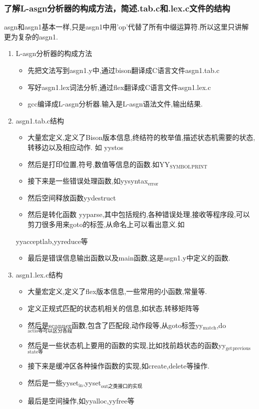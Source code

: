 \documentclass[11pt]{article}
\begin{document}
\subsubsection{了解L-asgn分析器的构成方法，简述.tab.c和.lex.c文件的结构}
\label{sec-1-1-4}
asgn和asgn1基本一样,只是asgn1中用'op'代替了所有中缀运算符.所以这里只讲解更为复杂的asgn1.
\begin{enumerate}
\item L-asgn分析器的构成方法
\label{sec-1-1-4-1}
\begin{itemize}
\item 先把文法写到asgn1.y中,通过bison翻译成C语言文件asgn1.tab.c
\item 写好asgn1.lex词法分析,通过flex翻译成C语言文件asgn1.lex.c
\item gcc编译成L-asgn分析器.输入是L-asgn语法文件,输出结果.
\end{itemize}
\item asgn1.tab.c结构
\label{sec-1-1-4-2}
\begin{itemize}
\item 大量宏定义,定义了Bison版本信息,终结符的枚举值,描述状态机需要的状态,转移边以及相应动作. 如 yystos
\item 然后是打印位置,符号,数值等信息的函数.如YY$_{\text{SYMBOL}}$$_{\text{PRINT}}$
\item 接下来是一些错误处理函数,如yysyntax$_{\text{error}}$
\item 然后空间释放函数yydestruct
\item 然后是转化函数 yyparse,其中包括规约,各种错误处理,接收等程序段,可以剪刀很多用来goto的标签,从命名上可以看出意义.如
\end{itemize}
yyacceptlab,yyreduce等     
\begin{itemize}
\item 最后是错误信息输出函数以及main函数,这是asgn1.y中定义的函数.
\end{itemize}
\item asgn1.lex.c结构
\label{sec-1-1-4-3}
\begin{itemize}
\item 大量宏定义,定义了flex版本信息,一些常用的小函数,常量等.
\item 定义正规式匹配的状态机相关的信息,如状态,转移矩阵等
\item 然后是scanner函数,包含了匹配段,动作段等,从goto标签yy$_{\text{match}}$,do$_{\text{actio等可以区分各段}}$
\item 然后是一些状态机上要用的函数的实现,比如找前趋状态的函数yy$_{\text{get}}$$_{\text{previous}}$$_{\text{state等}}$
\item 接下来是缓冲区各种操作函数的实现,如create,delete等操作.
\item 然后是一些yyset$_{\text{in}}$,yyset$_{\text{out之类接口的实现}}$
\item 最后是空间操作,如yyalloc,yyfree等
\end{itemize}
\end{enumerate}
\end{document}

